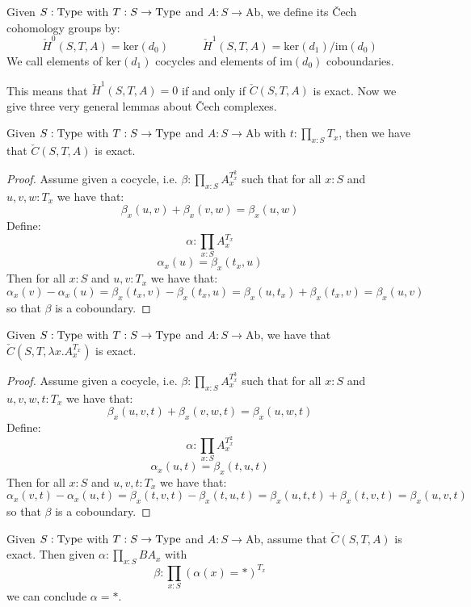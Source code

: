 \begin{definition}
Given $S:\mathrm{Type}$ with $T:S\to \mathrm{Type}$ and $A:S\to\mathrm{Ab}$, we define its \v{C}ech cohomology groups by:
\[
  \check{H}^0(S,T,A) = \mathrm{ker}(d_0)\quad \quad \quad \check{H}^1(S,T,A) = \mathrm{ker}(d_1)/\mathrm{im}(d_0)
\]
We call elements of $\mathrm{ker}(d_1)$ cocycles and elements of $\mathrm{im}(d_0)$ coboundaries.
\end{definition}

This means that $\check{H}^1(S,T,A) = 0$ if and only if $\check{C}(S,T,A)$ is exact. Now we give three very general lemmas about \v{C}ech complexes.

\begin{lemma}\label{section-exact-cech-complex}
Given $S:\mathrm{Type}$ with $T:S\to \mathrm{Type}$ and $A:S\to\mathrm{Ab}$ with $t:\prod_{x:S}T_x$, then we have that $\check{C}(S,T,A)$ is exact.
\end{lemma}

\begin{proof}
Assume given a cocycle, i.e. $\beta:\prod_{x:S}A_x^{T_x^2}$ such that for all $x:S$ and $u,v,w:T_x$ we have that:
\[\beta_x(u,v)+\beta_x(v,w) = \beta_x(u,w)\]
Define:
\[\alpha:\prod_{x:S}A_x^{T_x}\]
\[\alpha_x(u) = \beta_x(t_x,u)\]
Then for all $x:S$ and $u,v:T_x$ we have that:
\[\alpha_x(v)-\alpha_x(u) = \beta_x(t_x,v) - \beta_x(t_x,u) = \beta_x(u,t_x)+\beta_x(t_x,v) = \beta_x(u,v)\]
so that $\beta$ is a coboundary.
\end{proof}

\begin{lemma}\label{canonical-exact-cech-complex}
Given $S:\mathrm{Type}$ with $T:S\to \mathrm{Type}$ and $A:S\to\mathrm{Ab}$, we have that $\check{C}(S,T,\lambda x.A_x^{T_x})$ is exact.
\end{lemma}

\begin{proof}
Assume given a cocycle, i.e. $\beta:\prod_{x:S}A_x^{T_x^3}$ such that for all $x:S$ and $u,v,w,t:T_x$ we have that:
\[\beta_x(u,v,t)+\beta_x(v,w,t) = \beta_x(u,w,t)\]
Define:
\[\alpha:\prod_{x:S}A_x^{T_x^2}\]
\[\alpha_x(u,t) = \beta_x(t,u,t)\]
Then for all $x:S$ and $u,v,t:T_x$ we have that:
\[\alpha_x(v,t)-\alpha_x(u,t) = \beta_x(t,v,t) - \beta_x(t,u,t) = \beta_x(u,t,t)+\beta_x(t,v,t) = \beta_x(u,v,t)\]
so that $\beta$ is a coboundary.
\end{proof}

\begin{lemma}\label{exact-cech-complex-vanishing-cohomology}
Given $S:\mathrm{Type}$ with $T:S\to \mathrm{Type}$ and $A:S\to\mathrm{Ab}$, assume that $\check{C}(S,T,A)$ is exact.
Then given $\alpha:\prod_{x:S}BA_x$ with
\[\beta: \prod_{x:S} (\alpha(x) = *)^{T_x}\]
we can conclude $\alpha = *$.
\end{lemma}

